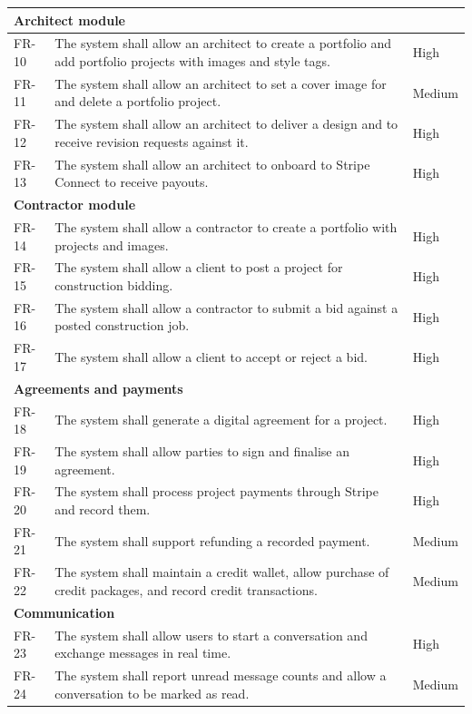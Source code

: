 {\begin{longtable}{|l|p{9.2cm}|l|}
  \multicolumn{3}{|l|}{\textbf{Architect module}} \\
  \hline
  FR-10 & The system shall allow an architect to create a portfolio and
          add portfolio projects with images and style tags. & High \\
  \hline
  FR-11 & The system shall allow an architect to set a cover image for
          and delete a portfolio project. & Medium \\
  \hline
  FR-12 & The system shall allow an architect to deliver a design and to
          receive revision requests against it. & High \\
  \hline
  FR-13 & The system shall allow an architect to onboard to Stripe
          Connect to receive payouts. & High \\
  \hline

  \multicolumn{3}{|l|}{\textbf{Contractor module}} \\
  \hline
  FR-14 & The system shall allow a contractor to create a portfolio with
          projects and images. & High \\
  \hline
  FR-15 & The system shall allow a client to post a project for
          construction bidding. & High \\
  \hline
  FR-16 & The system shall allow a contractor to submit a bid against a
          posted construction job. & High \\
  \hline
  FR-17 & The system shall allow a client to accept or reject a bid. & High \\
  \hline

  \multicolumn{3}{|l|}{\textbf{Agreements and payments}} \\
  \hline
  FR-18 & The system shall generate a digital agreement for a project. & High \\
  \hline
  FR-19 & The system shall allow parties to sign and finalise an
          agreement. & High \\
  \hline
  FR-20 & The system shall process project payments through Stripe and
          record them. & High \\
  \hline
  FR-21 & The system shall support refunding a recorded payment. & Medium \\
  \hline
  FR-22 & The system shall maintain a credit wallet, allow purchase of
          credit packages, and record credit transactions. & Medium \\
  \hline

  \multicolumn{3}{|l|}{\textbf{Communication}} \\
  \hline
  FR-23 & The system shall allow users to start a conversation and
          exchange messages in real time. & High \\
  \hline
  FR-24 & The system shall report unread message counts and allow a
          conversation to be marked as read. & Medium \\
  \hline


\end{longtable}}
